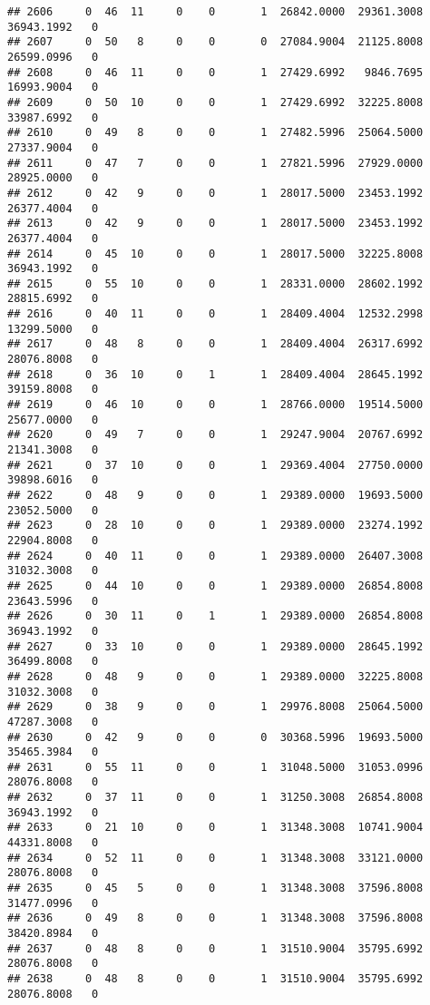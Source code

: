 \documentclass[
]{article}
\begin{document}
\begin{enumerate}
\begin{verbatim}
## 2606     0  46  11     0    0       1  26842.0000  29361.3008  36943.1992   0
## 2607     0  50   8     0    0       0  27084.9004  21125.8008  26599.0996   0
## 2608     0  46  11     0    0       1  27429.6992   9846.7695  16993.9004   0
## 2609     0  50  10     0    0       1  27429.6992  32225.8008  33987.6992   0
## 2610     0  49   8     0    0       1  27482.5996  25064.5000  27337.9004   0
## 2611     0  47   7     0    0       1  27821.5996  27929.0000  28925.0000   0
## 2612     0  42   9     0    0       1  28017.5000  23453.1992  26377.4004   0
## 2613     0  42   9     0    0       1  28017.5000  23453.1992  26377.4004   0
## 2614     0  45  10     0    0       1  28017.5000  32225.8008  36943.1992   0
## 2615     0  55  10     0    0       1  28331.0000  28602.1992  28815.6992   0
## 2616     0  40  11     0    0       1  28409.4004  12532.2998  13299.5000   0
## 2617     0  48   8     0    0       1  28409.4004  26317.6992  28076.8008   0
## 2618     0  36  10     0    1       1  28409.4004  28645.1992  39159.8008   0
## 2619     0  46  10     0    0       1  28766.0000  19514.5000  25677.0000   0
## 2620     0  49   7     0    0       1  29247.9004  20767.6992  21341.3008   0
## 2621     0  37  10     0    0       1  29369.4004  27750.0000  39898.6016   0
## 2622     0  48   9     0    0       1  29389.0000  19693.5000  23052.5000   0
## 2623     0  28  10     0    0       1  29389.0000  23274.1992  22904.8008   0
## 2624     0  40  11     0    0       1  29389.0000  26407.3008  31032.3008   0
## 2625     0  44  10     0    0       1  29389.0000  26854.8008  23643.5996   0
## 2626     0  30  11     0    1       1  29389.0000  26854.8008  36943.1992   0
## 2627     0  33  10     0    0       1  29389.0000  28645.1992  36499.8008   0
## 2628     0  48   9     0    0       1  29389.0000  32225.8008  31032.3008   0
## 2629     0  38   9     0    0       1  29976.8008  25064.5000  47287.3008   0
## 2630     0  42   9     0    0       0  30368.5996  19693.5000  35465.3984   0
## 2631     0  55  11     0    0       1  31048.5000  31053.0996  28076.8008   0
## 2632     0  37  11     0    0       1  31250.3008  26854.8008  36943.1992   0
## 2633     0  21  10     0    0       1  31348.3008  10741.9004  44331.8008   0
## 2634     0  52  11     0    0       1  31348.3008  33121.0000  28076.8008   0
## 2635     0  45   5     0    0       1  31348.3008  37596.8008  31477.0996   0
## 2636     0  49   8     0    0       1  31348.3008  37596.8008  38420.8984   0
## 2637     0  48   8     0    0       1  31510.9004  35795.6992  28076.8008   0
## 2638     0  48   8     0    0       1  31510.9004  35795.6992  28076.8008   0

\end{verbatim}
\end{enumerate}
\end{document}

